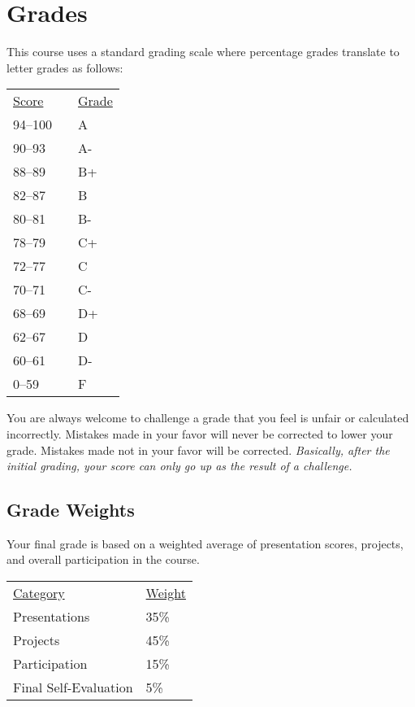 \documentclass[10pt]{article}
\begin{document}
\section{Grades}

This course uses a standard grading scale where percentage grades translate to letter grades as follows:

\begin{center}
\begin{small}
\begin{tabular}{lcl}
\underline{Score} & & \underline{Grade} \\
94--100 & & A \\
90--93 & & A- \\
88--89 & & B+ \\
82--87 & & B \\
80--81 & & B- \\
78--79 & & C+ \\
72--77 & & C \\
70--71 & & C- \\
68--69 & & D+ \\
62--67 & & D \\
60--61 & & D- \\
0--59 & & F
\end{tabular}
\end{small}
\end{center}


You are always welcome to challenge a grade that you feel is unfair or calculated incorrectly.  Mistakes made in your favor will never be corrected to lower your grade.  Mistakes made not in your favor will be corrected.  \textit{Basically, after the initial grading, your score can only go up as the result of a challenge.}


\subsection{Grade Weights}

Your final grade is based on a weighted average of presentation scores, projects, and overall participation in the course.

\begin{center}
  \begin{tabular}{ll}
  \underline{Category} & \underline{Weight} \\
    Presentations & 35\% \\
    Projects & 45\% \\
    Participation & 15\% \\
    Final Self-Evaluation & 5\%
  \end{tabular}
\end{center}
\end{document}
